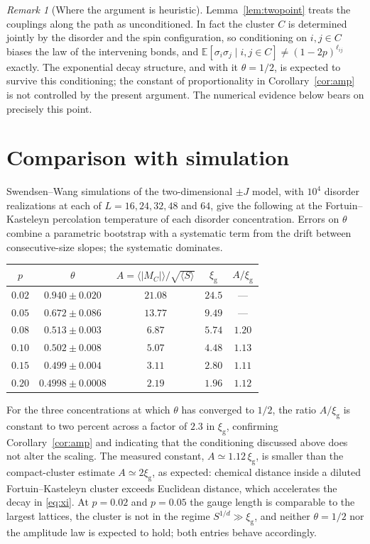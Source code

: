 \documentclass[11pt]{article}
\theoremstyle{remark}
\newtheorem{remark}{Remark}
\newcommand{\Mc}{M_{C}}
\newcommand{\xig}{\xi_{\mathrm{g}}}
\begin{document}
\begin{remark}[Where the argument is heuristic]
Lemma~\ref{lem:twopoint} treats the couplings along the path as unconditioned. In fact the
cluster $C$ is determined jointly by the disorder and the spin configuration, so
conditioning on $i,j \in C$ biases the law of the intervening bonds, and
$\mathbb{E}[\sigma_i\sigma_j \mid i,j \in C] \ne (1-2p)^{\ell_{ij}}$ exactly. The
exponential decay structure, and with it $\theta = 1/2$, is expected to survive this
conditioning; the constant of proportionality in Corollary~\ref{cor:amp} is not controlled
by the present argument. The numerical evidence below bears on precisely this point.
\end{remark}

\section{Comparison with simulation}

Swendsen--Wang simulations of the two-dimensional $\pm J$ model, with $10^{4}$ disorder
realizations at each of $L = 16,24,32,48$ and $64$, give the following at the
Fortuin--Kasteleyn percolation temperature of each disorder concentration. Errors on
$\theta$ combine a parametric bootstrap with a systematic term from the drift between
consecutive-size slopes; the systematic dominates.

\begin{center}
\begin{tabular}{ccccc}
\toprule
$p$ & $\theta$ & $A = \langle|\Mc|\rangle/\sqrt{\langle S\rangle}$ & $\xig$ & $A/\xig$ \\
\midrule
$0.02$ & $0.940 \pm 0.020$ & $21.08$ & $24.5$  & --- \\
$0.05$ & $0.672 \pm 0.086$ & $13.77$ & $9.49$  & --- \\
$0.08$ & $0.513 \pm 0.003$ & $6.87$  & $5.74$  & $1.20$ \\
$0.10$ & $0.502 \pm 0.008$ & $5.07$  & $4.48$  & $1.13$ \\
$0.15$ & $0.499 \pm 0.004$ & $3.11$  & $2.80$  & $1.11$ \\
$0.20$ & $0.4998\pm 0.0008$& $2.19$  & $1.96$  & $1.12$ \\
\bottomrule
\end{tabular}
\end{center}

\noindent
For the three concentrations at which $\theta$ has converged to $1/2$, the ratio $A/\xig$
is constant to two percent across a factor of $2.3$ in $\xig$, confirming
Corollary~\ref{cor:amp} and indicating that the conditioning discussed above does not
alter the scaling. The measured constant, $A \simeq 1.12\,\xig$, is smaller than the
compact-cluster estimate $A \simeq 2\xig$, as expected: chemical distance inside a diluted
Fortuin--Kasteleyn cluster exceeds Euclidean distance, which accelerates the decay in
\eqref{eq:xi}. At $p = 0.02$ and $p = 0.05$ the gauge length is comparable to the largest
lattices, the cluster is not in the regime $S^{1/d} \gg \xig$, and neither $\theta = 1/2$
nor the amplitude law is expected to hold; both entries behave accordingly.
\end{document}
